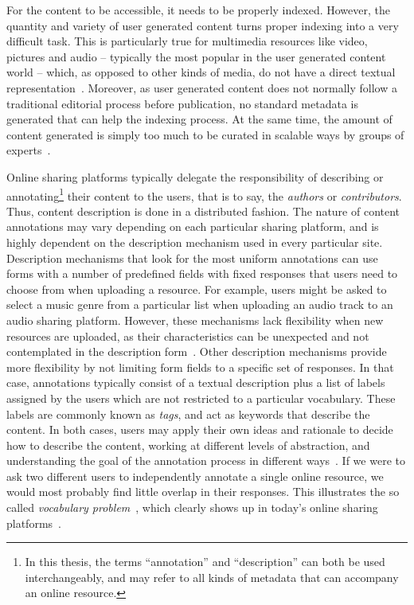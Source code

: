 For the content to be accessible, it needs to be properly indexed.
However, the quantity and variety of user generated content turns proper indexing into a very difficult task. 
This is particularly true for multimedia resources like video, pictures and audio -- typically the most popular in the user generated content world -- which, as opposed to other kinds of media, do not have a direct textual representation~\citep{Bischoff2008}. 
Moreover, as user generated content does not normally follow a traditional editorial process before publication, no standard metadata is generated that can help the indexing process.
At the same time, the amount of content generated is simply too much to be curated in scalable ways by groups of experts~\citep{Mathes2004}.

Online sharing platforms typically delegate the responsibility of describing or annotating\footnote{In this thesis, the terms ``annotation'' and ``description'' can both be used interchangeably, and may refer to all kinds of metadata that can accompany an online resource.} their content to the users, that is to say, the \emph{authors} or \emph{contributors}. Thus, content description is done in a distributed fashion.
The nature of content annotations may vary depending on each particular sharing platform, and is highly dependent on the description mechanism used in every particular site.
Description mechanisms that look for the most uniform annotations can use forms with a number of predefined fields with fixed responses that users need to choose from when uploading a resource. For example, users might be asked to select a music genre from a particular list when uploading an audio track to an audio sharing platform.
However, these mechanisms lack flexibility when new resources are uploaded, as their characteristics can be unexpected and not contemplated in the description form~\citep{Mathes2004,shirky2005ontology,halpin2006,Macgregor2004}. Other description mechanisms provide more flexibility by not limiting form fields to a specific set of responses. In that case, annotations typically consist of a textual description plus a list of labels assigned by the users which are not restricted to a particular vocabulary.
These labels are commonly known as \emph{tags}, and act as keywords that describe the content.
In both cases, users may apply their own ideas and rationale to decide how to describe the content, working at different levels of abstraction, and understanding the goal of the annotation process in different ways~\citep{golder2006}. 
If we were to ask two different users to independently annotate a single online resource, we would most probably find little overlap in their responses. This illustrates the so called \emph{vocabulary problem}~\citep{Furnas1987}, which clearly shows up in today's online sharing platforms~\citep{marlow2006}.


